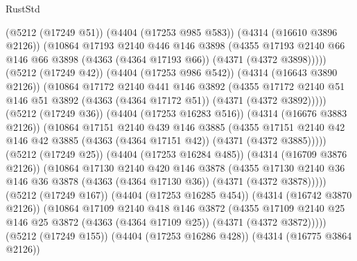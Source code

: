 \begin{lexlean}{RustStd}
\begin{coremodule}
                  (@5212 (@17249 @51))
                  (@4404 (@17253 @985 @583))
                  (@4314 (@16610 @3896 @2126))
                  (@10864
                    @17193
                    @2140
                    @446
                    @146
                    @3898
                    (@4355
                      @17193
                      @2140
                      @66
                      @146
                      @66
                      @3898
                      (@4363 (@4364 @17193 @66))
                      (@4371 (@4372 @3898)))))
                (@5212 (@17249 @42))
                (@4404 (@17253 @986 @542))
                (@4314 (@16643 @3890 @2126))
                (@10864
                  @17172
                  @2140
                  @441
                  @146
                  @3892
                  (@4355
                    @17172
                    @2140
                    @51
                    @146
                    @51
                    @3892
                    (@4363 (@4364 @17172 @51))
                    (@4371 (@4372 @3892)))))
              (@5212 (@17249 @36))
              (@4404 (@17253 @16283 @516))
              (@4314 (@16676 @3883 @2126))
              (@10864
                @17151
                @2140
                @439
                @146
                @3885
                (@4355
                  @17151
                  @2140
                  @42
                  @146
                  @42
                  @3885
                  (@4363 (@4364 @17151 @42))
                  (@4371 (@4372 @3885)))))
            (@5212 (@17249 @25))
            (@4404 (@17253 @16284 @485))
            (@4314 (@16709 @3876 @2126))
            (@10864
              @17130
              @2140
              @420
              @146
              @3878
              (@4355
                @17130
                @2140
                @36
                @146
                @36
                @3878
                (@4363 (@4364 @17130 @36))
                (@4371 (@4372 @3878)))))
          (@5212 (@17249 @167))
          (@4404 (@17253 @16285 @454))
          (@4314 (@16742 @3870 @2126))
          (@10864
            @17109
            @2140
            @418
            @146
            @3872
            (@4355
              @17109
              @2140
              @25
              @146
              @25
              @3872
              (@4363 (@4364 @17109 @25))
              (@4371 (@4372 @3872)))))
        (@5212 (@17249 @155))
        (@4404 (@17253 @16286 @428))
        (@4314 (@16775 @3864 @2126))

\end{coremodule}
\end{lexlean}
